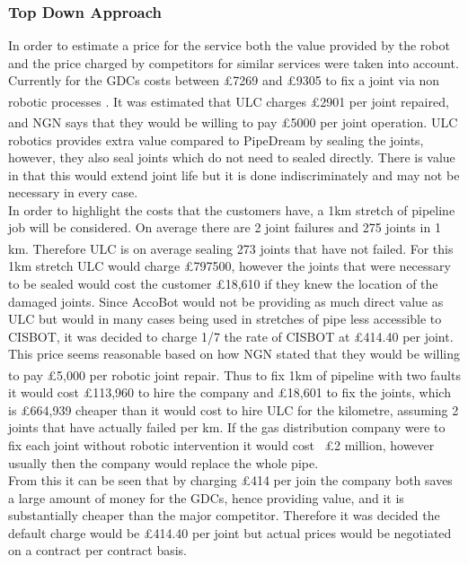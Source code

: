 \documentclass[11pt]{article}		%
\newcommand{\supercite}[1]{\textsuperscript{\cite{#1}}}		%
\begin{document}
        	\subsubsection{Top Down Approach}
	            In order to estimate a price for the service both the value provided by the robot and the price charged by competitors for similar services were taken into account. Currently for the GDCs costs between £7269 and £9305 to fix a joint via non robotic processes \supercite{NYT}. It was estimated that ULC charges £2901 per joint repaired,\supercite{NYT} and NGN says that they would be willing to pay £5000 per joint operation. \supercite{NGN} 
	            ULC robotics provides extra value compared to PipeDream by sealing the joints, however, they also seal joints which do not need to sealed directly. There is value in that this would extend joint life but it is done indiscriminately and may not be necessary in every case.
	            \\
	            In order to highlight the costs that the customers have, a 1km stretch of pipeline job will be considered. On average there are 2 joint failures and 275 joints in 1 km. \supercite{SGN_Southern} Therefore ULC is on average sealing 273 joints that have not failed. For this 1km stretch ULC would charge £797500, however the joints that were necessary to be sealed would cost the customer £18,610 if they knew the location of the damaged joints. Since AccoBot would not be providing as much direct value as ULC but would in many cases being used in stretches of pipe less accessible to CISBOT, it was decided to charge 1/7 the rate of CISBOT at £414.40 per joint. This price seems reasonable based on how NGN stated that they would be willing to pay £5,000 per robotic joint repair.\supercite{NGN} Thus to fix 1km of pipeline with two faults it would cost £113,960 to hire the company and £18,601 to fix the joints, which is £664,939 cheaper than it would cost to hire ULC for the kilometre, assuming 2 joints that have actually failed per km. If the gas distribution company were to fix each joint without robotic intervention it would cost ~£2 million, however usually then the company would replace the whole pipe.
	            \\
	            From this it can be seen that by charging £414 per join the company both saves a large amount of money for the GDCs, hence providing value, and it is substantially cheaper than the major competitor. Therefore it was decided the default charge would be £414.40 per joint but actual prices would be negotiated on a contract per contract basis.
\end{document}
